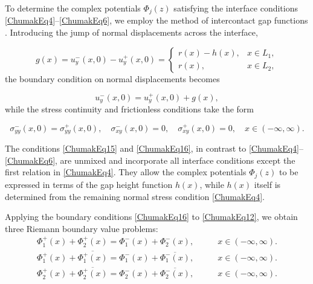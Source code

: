 To determine the complex potentials $\Phi_j(z)$ satisfying the interface conditions \eqref{ChumakEq4}–\eqref{ChumakEq6}, we employ the method of intercontact gap functions \cite{Chumak32}. Introducing the jump of normal displacements across the interface,

\begin{equation}
	\label{ChumakEq12}
	g(x) = u_y^{-}(x,0) - u_y^{+}(x,0)
	=
	\begin{cases}
		r(x) - h(x), & x \in L_{1}, \\
		r(x),        & x \in L_{2},
	\end{cases}
\end{equation}
%
the boundary condition on normal displacements becomes

\begin{equation}
	\label{ChumakEq13}
	u_y^{-}(x,0) = u_y^{+}(x,0) + g(x),
\end{equation}
%
while the stress continuity and frictionless conditions take the form

\begin{equation}
	\label{ChumakEq14}
	\sigma_{yy}^{-}(x,0) = \sigma_{yy}^{+}(x,0),
	\quad
	\sigma_{xy}^{-}(x,0) = 0,
	\quad
	\sigma_{xy}^{+}(x,0) = 0,
	\quad
	x \in (-\infty,\infty).
\end{equation}

The conditions \eqref{ChumakEq15} and \eqref{ChumakEq16}, in contrast to \eqref{ChumakEq4}–\eqref{ChumakEq6}, are unmixed and incorporate all interface conditions except the first relation in \eqref{ChumakEq4}. They allow the complex potentials $\Phi_j(z)$ to be expressed in terms of the gap height function $h(x)$, while $h(x)$ itself is determined from the remaining normal stress condition \eqref{ChumakEq4}.

Applying the boundary conditions \eqref{ChumakEq16} to \eqref{ChumakEq12}, we obtain three Riemann boundary value problems:
\begin{align}
	\label{ChumakEq15}
	\Phi_{1}^{+}(x) + \Phi_{2}^{+}(x)
	= \Phi_{1}^{-}(x) + \Phi_{2}^{-}(x),
	\qquad  & x \in (-\infty,\infty).
\\
	\label{ChumakEq16}
	\Phi_{1}^{+}(x) + \overline{\Phi_{1}^{+}(x)}
	= \Phi_{1}^{-}(x) + \overline{\Phi_{1}^{-}(x)},
	\qquad  & x \in (-\infty,\infty).
\\
	\label{ChumakEq17}
	\Phi_{2}^{+}(x) + \overline{\Phi_{2}^{+}(x)}
	= \Phi_{2}^{-}(x) + \overline{\Phi_{2}^{-}(x)},
	\qquad  & x \in (-\infty,\infty).
\end{align}


